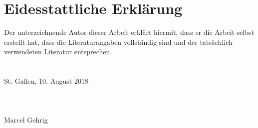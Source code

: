 \chapter{Eidesstattliche Erklärung}

	Der unterzeichnende Autor dieser Arbeit erklärt hiermit, dass er die Arbeit selbst erstellt hat,
	dass die Literaturangaben vollständig sind und der tatsächlich verwendeten Literatur entsprechen.\\
	\\
 	\\
	St. Gallen, 10. August 2018\\
    \\
    \\
    \\
  	Marcel Gehrig\\
